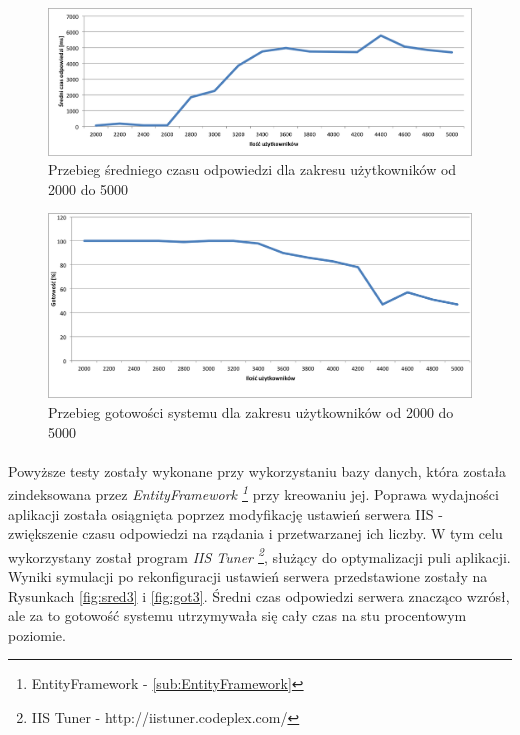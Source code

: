 \begin{figure}[ht]
	\centering
		\includegraphics[width=1\linewidth]{assets/sredni2.png}
		\caption{Przebieg średniego czasu odpowiedzi dla zakresu użytkowników od 2000 do 5000}
	\label{fig:sred2}
\end{figure}

\begin{figure}[ht]
	\centering
		\includegraphics[width=1\linewidth]{assets/gotowosc2.png}
		\caption{Przebieg gotowości systemu dla zakresu użytkowników od 2000 do 5000}
	\label{fig:got2}
\end{figure}

\paragraph{} %
\label{par:}
Powyższe testy zostały wykonane przy wykorzystaniu bazy danych, która została zindeksowana przez \textit{EntityFramework \footnote{EntityFramework - \ref{sub:EntityFramework}}} przy kreowaniu jej. Poprawa wydajności aplikacji została osiągnięta poprzez modyfikację ustawień serwera IIS -  zwiększenie czasu odpowiedzi na rządania i przetwarzanej ich liczby. W tym celu wykorzystany został program \textit{IIS Tuner \footnote{IIS Tuner - http://iistuner.codeplex.com/}}, służący do optymalizacji puli aplikacji. Wyniki symulacji po rekonfiguracji ustawień serwera przedstawione zostały na Rysunkach \ref{fig:sred3} i \ref{fig:got3}. Średni czas odpowiedzi serwera znacząco wzrósł, ale za to gotowość systemu utrzymywała się cały czas na stu procentowym poziomie.


